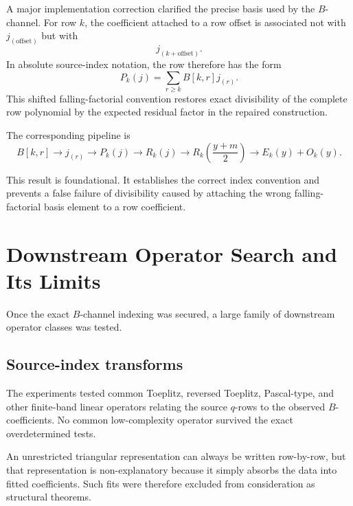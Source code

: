 \documentclass[11pt]{article}
\begin{document}
A major implementation correction clarified the precise basis used by the $B$-channel. For row $k$, the coefficient attached to a row offset is associated not with $j_{(\text{offset})}$ but with
\begin{equation}
    j_{(k+\mathrm{offset})}.
\end{equation}
In absolute source-index notation, the row therefore has the form
\begin{equation}
    P_k(j)=\sum_{r\ge k} B[k,r]j_{(r)}.
\end{equation}
This shifted falling-factorial convention restores exact divisibility of the complete row polynomial by the expected residual factor in the repaired construction.

The corresponding pipeline is
\begin{equation}
    B[k,r]
    \longrightarrow
    j_{(r)}
    \longrightarrow
    P_k(j)
    \longrightarrow
    R_k(j)
    \longrightarrow
    R_k\!\left(\frac{y+m}{2}\right)
    \longrightarrow
    E_k(y)+O_k(y).
\end{equation}

This result is foundational. It establishes the correct index convention and prevents a false failure of divisibility caused by attaching the wrong falling-factorial basis element to a row coefficient.

\section{Downstream Operator Search and Its Limits}

Once the exact $B$-channel indexing was secured, a large family of downstream operator classes was tested.

\subsection{Source-index transforms}

The experiments tested common Toeplitz, reversed Toeplitz, Pascal-type, and other finite-band linear operators relating the source $q$-rows to the observed $B$-coefficients. No common low-complexity operator survived the exact overdetermined tests.

An unrestricted triangular representation can always be written row-by-row, but that representation is non-explanatory because it simply absorbs the data into fitted coefficients. Such fits were therefore excluded from consideration as structural theorems.
\end{document}
